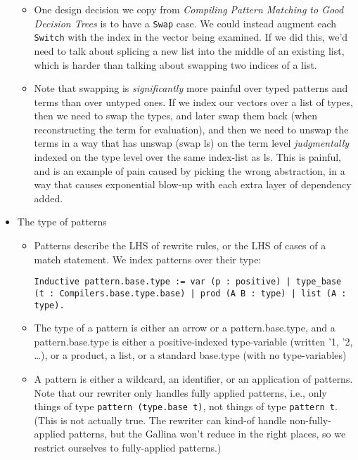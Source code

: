 \documentclass[
]{article}
\providecommand{\tightlist}{%
  \setlength{\itemsep}{0pt}\setlength{\parskip}{0pt}}
\begin{document}
\begin{itemize}
  \begin{itemize}
  \tightlist
  \item
    One design decision we copy from \emph{Compiling Pattern Matching to
    Good Decision Trees} is to have a \texttt{Swap} case. We could
    instead augment each \texttt{Switch} with the index in the vector
    being examined. If we did this, we'd need to talk about splicing a
    new list into the middle of an existing list, which is harder than
    talking about swapping two indices of a list.
  \item
    Note that swapping is \emph{significantly} more painful over typed
    patterns and terms than over untyped ones. If we index our vectors
    over a list of types, then we need to swap the types, and later swap
    them back (when reconstructing the term for evaluation), and then we
    need to unswap the terms in a way that has unswap (swap ls) on the
    term level \emph{judgmentally} indexed on the type level over the
    same index-list as ls. This is painful, and is an example of pain
    caused by picking the wrong abstraction, in a way that causes
    exponential blow-up with each extra layer of dependency added.
  \end{itemize}
\item
  The type of patterns

  \begin{itemize}
  \item
    Patterns describe the LHS of rewrite rules, or the LHS of cases of a
    match statement. We index patterns over their type:

\begin{verbatim}
Inductive pattern.base.type := var (p : positive) | type_base (t : Compilers.base.type.base) | prod (A B : type) | list (A : type).
\end{verbatim}
  \item
    The type of a pattern is either an arrow or a pattern.base.type, and
    a pattern.base.type is either a positive-indexed type-variable
    (written '1, '2, \ldots), or a product, a list, or a standard
    base.type (with no type-variables)
  \item
    A pattern is either a wildcard, an identifier, or an application of
    patterns. Note that our rewriter only handles fully applied
    patterns, i.e., only things of type
    \texttt{pattern\ (type.base\ t)}, not things of type
    \texttt{pattern\ t}. (This is not actually true. The rewriter can
    kind-of handle non-fully-applied patterns, but the Gallina won't
    reduce in the right places, so we restrict ourselves to
    fully-applied patterns.)


\end{itemize}
\end{itemize}
\end{document}
